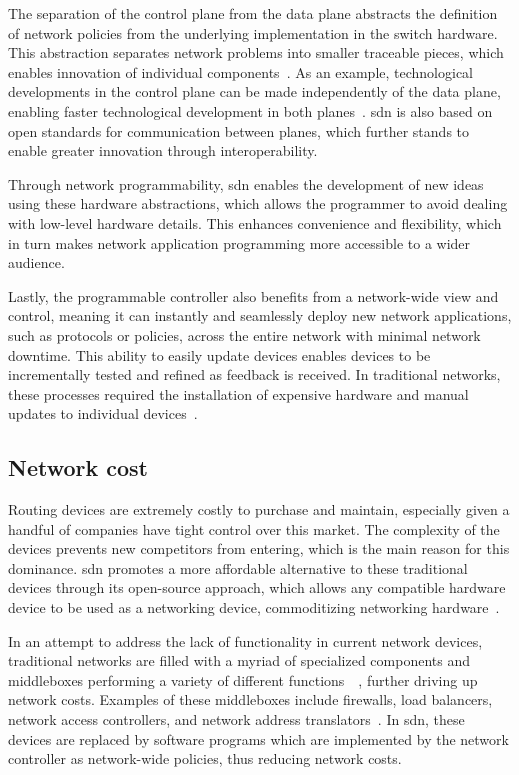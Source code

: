 The separation of the control plane from the data plane abstracts the definition of network policies from the underlying implementation in the switch hardware. This abstraction separates network problems into smaller traceable pieces, which enables innovation of individual components~\cite{kreutz_software-defined_2015}. As an example, technological developments in the control plane can be made independently of the data plane, enabling faster technological development in both planes~\cite{thyagaturu_software_2016}. \gls{sdn} is also based on open standards for communication between planes, which further stands to enable greater innovation through interoperability.

Through network programmability, \gls{sdn} enables the development of new ideas using these hardware abstractions, which allows the programmer to avoid dealing with low-level hardware details. This enhances convenience and flexibility, which in turn makes network application programming more accessible to a wider audience.

Lastly, the programmable controller also benefits from a network-wide view and control, meaning it can instantly and seamlessly deploy new network applications, such as protocols or policies, across the entire network with minimal network downtime. This ability to easily update devices enables devices to be incrementally tested and refined as feedback is received. In traditional networks, these processes required the installation of expensive hardware and manual updates to individual devices~\cite{xia_survey_2015}. 

\subsection{Network cost}
Routing devices are extremely costly to purchase and maintain, especially given a handful of companies have tight control over this market. The complexity of the devices prevents new competitors from entering, which is the main reason for this dominance. \gls{sdn} promotes a more affordable alternative to these traditional devices through its open-source approach, which allows any compatible hardware device to be used as a networking device, commoditizing networking hardware~\cite{nunes_survey_2014}. 

In an attempt to address the lack of functionality in current network devices, traditional networks are filled with a myriad of specialized components and middleboxes performing a variety of different functions~\cite{feamster_road_2013}~\cite{kreutz_software-defined_2015}, further driving up network costs. Examples of these middleboxes include firewalls, load balancers, network access controllers, and network address translators~\cite{nunes_survey_2014}. In \gls{sdn}, these devices are replaced by software programs which are implemented by the network controller as network-wide policies, thus reducing network costs.

